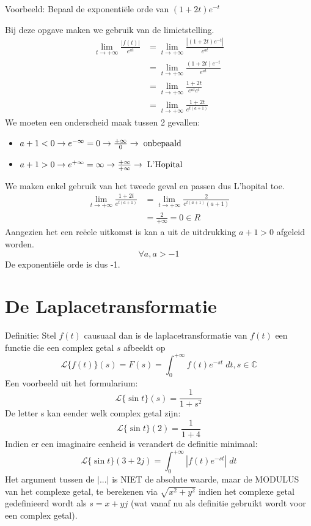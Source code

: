 \documentclass[12pt]{report}
\newcommand{\example}[2]{
    \hrulefill
    
    Voorbeeld: #1
    
    #2
    
    \hrulefill
}
\begin{document}
\example{Bepaal de exponentiële orde van $(1 + 2t)e^{-t}$}{
Bij deze opgave maken we gebruik van de limietstelling.
\begin{equation*}
\begin{split}
\lim_{t \to +\infty} \frac{|f(t)|}{e^{at}} & = \lim_{t \to +\infty} \frac{|(1 + 2t)e^{-t}|}{e^{at}} \\
                                            & = \lim_{t \to +\infty} \frac{(1 + 2t)e^{-t}}{e^{at}} \\
                                            & = \lim_{t \to +\infty} \frac{1 + 2t}{e^{at}e^{t}} \\
                                            & = \lim_{t \to +\infty} \frac{1 + 2t}{e^{t(a +1)}} 
\end{split}
\end{equation*}
We moeten een onderscheid maak tussen 2 gevallen:
\begin{itemize}
\item $a + 1 < 0 \rightarrow e^{-\infty} = 0 \rightarrow \frac{+\infty}{0} \rightarrow \; \hbox{onbepaald}$
\item $a + 1 > 0 \rightarrow e^{+\infty} = \infty \rightarrow \frac{+\infty}{+\infty} \rightarrow \; \hbox{L'Hopital}$
\end{itemize}
We maken enkel gebruik van het tweede geval en passen dus L'hopital toe.
\begin{equation*}
\begin{split}
\lim_{t \to +\infty} \frac{1 + 2t}{e^{t(a +1)}} & = \lim_{t \to +\infty} \frac{2}{e^{t(a +1)}(a+1)} \\
                                                & = \frac{2}{+\infty} = 0 \in R
\end{split}
\end{equation*}
Aangezien het een reëele uitkomst is kan a uit de uitdrukking $a + 1 > 0$ afgeleid worden.
$$\forall a, a > -1$$
De exponentiële orde is dus -1.
}
\section{De Laplacetransformatie}
Definitie: Stel $f(t)$ causuaal dan is de laplacetransformatie van $f(t)$ een functie die een complex getal $s$ afbeeldt op 
$$\mathcal{L}\{f(t)\}(s) = F(s) = \int_{0}^{+\infty}f(t)e^{-st}\;dt, s \in \mathbb{C}$$
Een voorbeeld uit het formularium:
$$\mathcal{L}\{\sin t\}(s) = \frac{1}{1 + s^2}$$
De letter s kan eender welk complex getal zijn:
$$\mathcal{L}\{\sin t\}(2) = \frac{1}{1 + 4}$$
Indien er een imaginaire eenheid is verandert de definitie minimaal:
$$\mathcal{L}\{\sin t\}(3 + 2j) = \int_{0}^{+\infty}|f(t)e^{-st}|\;dt$$
Het argument tussen de $| ... |$ is NIET de absolute waarde, maar de MODULUS van het complexe getal, te berekenen via $\sqrt{x^2 + y^2}$ indien het complexe getal gedefinieerd wordt als $s = x + yj$ (wat vanaf nu als definitie gebruikt wordt voor een complex getal).
\end{document}
